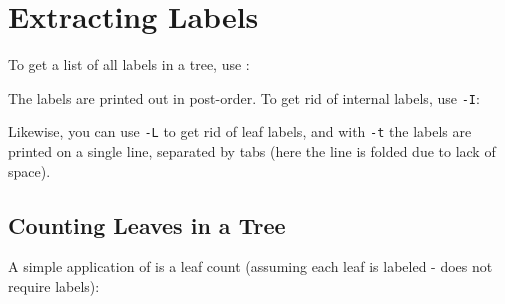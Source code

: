 

\section{Extracting Labels}
\label{sct_labels}

To get a list of all labels in a tree, use :

\begin{samepage}


\end{samepage}

\noindent{}The labels are printed out in post-order. To get rid of internal labels, use \texttt{-I}:

\begin{samepage}


\end{samepage}

\noindent{}Likewise, you can use \texttt{-L} to get rid of leaf labels, and
with \texttt{-t} the labels are printed on a single line, separated by tabs (here the line is folded due to lack of space).

\begin{samepage}


\end{samepage}

\subsection{Counting Leaves in a Tree}
\label{sct_counting_leaves}

A simple application of  is a leaf count (assuming each leaf is
labeled - \nw{} does not require labels):

\begin{samepage}


\end{samepage}
